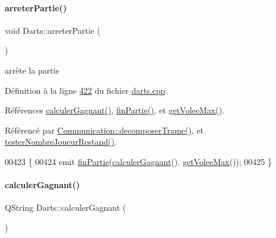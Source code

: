 \mbox{\label{class_darts_aa9685f754172d995cdd04d39d9651227}} 
\paragraph{\texorpdfstring{arreter\+Partie()}{arreterPartie()}}
{\footnotesize\ttfamily void Darts\+::arreter\+Partie (\begin{DoxyParamCaption}{ }\end{DoxyParamCaption})}



arrête la partie 



Définition à la ligne \hyperlink{darts_8cpp_source_l00422}{422} du fichier \hyperlink{darts_8cpp_source}{darts.\+cpp}.



Références \hyperlink{darts_8cpp_source_l00433}{calculer\+Gagnant()}, \hyperlink{class_darts_a751870924fe01a94fbf49ce45451a218}{fin\+Partie()}, et \hyperlink{darts_8cpp_source_l00066}{get\+Volee\+Max()}.



Référencé par \hyperlink{communication_8cpp_source_l00188}{Communication\+::decomposer\+Trame()}, et \hyperlink{darts_8cpp_source_l00453}{tester\+Nombre\+Joueur\+Restand()}.


\begin{DoxyCode}
00423 \{
00424     emit \hyperlink{class_darts_a751870924fe01a94fbf49ce45451a218}{finPartie}(\hyperlink{class_darts_a4d7196c95f584cdce4a33d52f934121f}{calculerGagnant}(), \hyperlink{class_darts_af2ca14bafbcdabe87fc306cc2e1d390e}{getVoleeMax}());
00425 \}
\end{DoxyCode}
\mbox{\label{class_darts_a4d7196c95f584cdce4a33d52f934121f}} 
\paragraph{\texorpdfstring{calculer\+Gagnant()}{calculerGagnant()}}
{\footnotesize\ttfamily Q\+String Darts\+::calculer\+Gagnant (\begin{DoxyParamCaption}{ }\end{DoxyParamCaption})\hspace{0.3cm}{\ttfamily [private]}}



